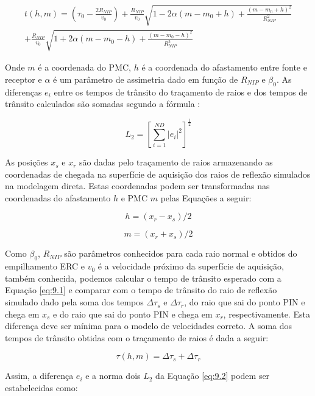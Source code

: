 \begin{multline}
\label{eq:9.1}
t(h,m)= \left( \tau_0-\frac{2R_{NIP}}{v_0} \right) 
+\frac{R_{NIP}}{v_0}\sqrt{1-2\alpha(m-m_0+h)+\frac{(m-m_0+h)^2}{R_{NIP}^2}} \\
+\frac{R_{NIP}}{v_0}\sqrt{1+2\alpha(m-m_0-h)+\frac{(m-m_0-h)^2}{R_{NIP}^2}}
\end{multline}


Onde $m$ é a coordenada do PMC, $h$ é a coordenada do afastamento entre fonte e receptor e
$\alpha$ é um parâmetro de assimetria dado em função de $R_{NIP}$ e $\beta_0$.
As diferenças $e_i$ entre os tempos de trânsito do traçamento de raios e dos tempos de trânsito
calculados são somadas segundo a fórmula \cite{stoffa}:

\begin{equation}
\label{eq:9.2}
L_2 = \left[ \sum_{i=1}^{ND} |e_i|^2 \right]^\frac{1}{2}
\end{equation}

As posições $x_s$ e $x_r$ são dadas pelo traçamento de raios armazenando as coordenadas de chegada
na superfície de aquisição dos raios de reflexão simulados na modelagem direta. Estas coordenadas podem
ser transformadas nas coordenadas do afastamento $h$ e PMC $m$ pelas Equações a seguir:

\begin{equation}
\label{eq:9.3}
h = (x_r-x_s)/2
\end{equation}

\begin{equation}
\label{eq:9.4}
m = (x_r+x_s)/2
\end{equation}

Como $\beta_0$, $R_{NIP}$ são parâmetros conhecidos para cada raio normal e obtidos do empilhamento
ERC e $v_0$ é a velocidade próximo da superfície de aquisição, também conhecida, podemos calcular o
tempo de trânsito esperado com a Equação \ref{eq:9.1} e comparar com o tempo de trânsito do raio de
reflexão simulado
dado pela soma dos tempos $\Delta \tau_s$ e $\Delta \tau_r$,
do raio que sai do ponto PIN e chega em $x_s$
e do raio
que sai do ponto PIN e chega em $x_r$, respectivamente.
Esta diferença deve ser mínima para o modelo de velocidades
correto. A soma dos tempos de trânsito obtidas com o
traçamento de raios é dada a seguir:

\begin{equation}
\label{eq:9.5}
\tau(h,m) = \Delta \tau_s + \Delta \tau_r
\end{equation}

Assim, a diferença $e_i$ e a norma dois $L_2$ da Equação \ref{eq:9.2} podem ser estabelecidas como:

